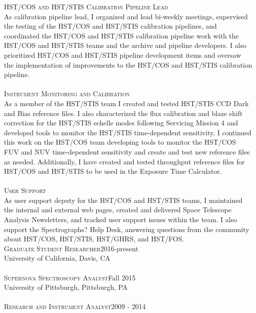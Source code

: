 \documentclass[10pt]{cv}
\begin{document}
\begin{llist}
\textsc{HST/COS and HST/STIS Calibration Pipeline Lead}\\
As calibration pipeline lead, I organized and lead bi-weekly meetings, supervised the testing of the HST/COS and HST/STIS calibration pipelines, and coordinated the HST/COS and HST/STIS calibration pipeline work with the HST/COS and HST/STIS teams and the archive and pipeline developers. I also prioritized HST/COS and HST/STIS pipeline development items and oversaw the implementation of improvements to the HST/COS and HST/STIS calibration pipeline.\\
\\
\textsc{Instrument Monitoring and Calibration}\\
As a member of the HST/STIS team I created and tested HST/STIS CCD Dark and Bias reference files. I also characterized the flux calibration and blaze shift correction for the HST/STIS echelle modes following Servicing Mission 4 and developed tools to monitor the HST/STIS time-dependent sensitivity. I continued this work on the HST/COS team developing tools to monitor the HST/COS FUV and NUV time-dependent sensitivity and create and test new reference files as needed. Additionally, I have created and tested throughput reference files for HST/COS and HST/STIS to be used in the Exposure Time Calculator.\\
\\
\textsc{User Support}\\
As user support deputy for the HST/COS and HST/STIS teams, I maintained the internal and external web pages, created and delivered Space Telescope Analysis Newsletters, and tracked user support issues within the team. I also support the Spectrographs? Help Desk, answering questions from the community about HST/COS, HST/STIS, HST/GHRS, and HST/FOS.\\
%
\vspace{-0.1in}   
    \textsc{Graduate Student Researcher}\hfill2016-present \\
    University of California, Davis, CA\\
    \\
    \textsc{Supernova Spectroscopy Analyst}\hfill Fall 2015 \\
    University of Pittsburgh, Pittsburgh, PA\\
    \\
    \textsc{Research and Instrument Analyst}\hfill 2009 - 2014 \\

\end{llist}
\end{document}

